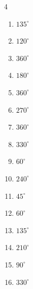 \begin{multicols}{4}
\begin{enumerate}
  \item $\displaystyle 135^{\circ}$

  \item $\displaystyle 120^{\circ}$

  \item $\displaystyle 360^{\circ}$
        \phantom{$\displaystyle =2\pi$}

  \item $\displaystyle 180^{\circ}$
        \phantom{$\displaystyle =\pi$}

  \item $\displaystyle 360^{\circ}$
        \phantom{$\displaystyle =2\pi$}

  \item $\displaystyle 270^{\circ}$

\columnbreak %

\resetques

  \item $\displaystyle 360^{\circ}$
        \phantom{$\displaystyle =2\pi$}

  \item $\displaystyle 330^{\circ}$

  \item $\displaystyle 60^{\circ}$

  \item $\displaystyle 240^{\circ}$

  \item $\displaystyle 45^{\circ}$

  \item $\displaystyle 60^{\circ}$

  \item $\displaystyle 135^{\circ}$

  \item $\displaystyle 210^{\circ}$

  \item $\displaystyle 90^{\circ}$

  \item $\displaystyle 330^{\circ}$


\end{enumerate}
\end{multicols}
